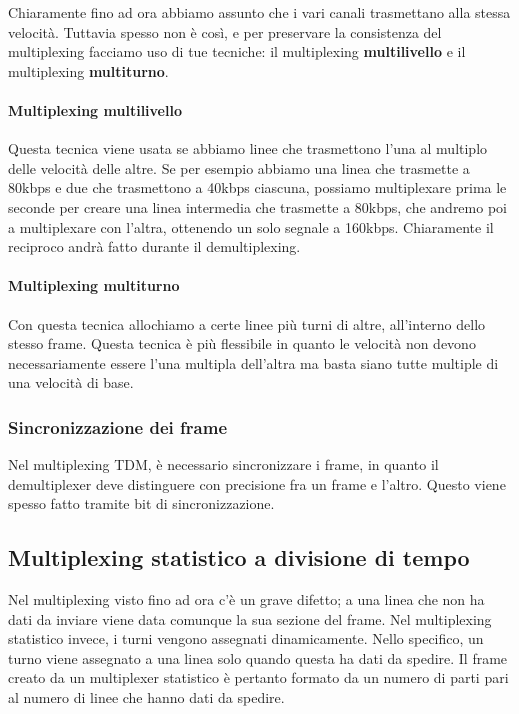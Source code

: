         Chiaramente fino ad ora abbiamo assunto che i vari canali trasmettano alla stessa velocità. Tuttavia spesso non è così, e per preservare la consistenza del multiplexing facciamo uso di tue tecniche: il multiplexing \textbf{multilivello} e il multiplexing \textbf{multiturno}.
        
        \paragraph{Multiplexing multilivello} Questa tecnica viene usata se abbiamo linee che trasmettono l'una al multiplo delle velocità delle altre. Se per esempio abbiamo una linea che trasmette a 80kbps e due che trasmettono a 40kbps ciascuna, possiamo multiplexare prima le seconde per creare una linea intermedia che trasmette a 80kbps, che andremo poi a multiplexare con l'altra, ottenendo un solo segnale a 160kbps. Chiaramente il reciproco andrà fatto durante il demultiplexing.
        
        \paragraph{Multiplexing multiturno} Con questa tecnica allochiamo a certe linee più turni di altre, all'interno dello stesso frame. Questa tecnica è più flessibile in quanto le velocità non devono necessariamente essere l'una multipla dell'altra ma basta siano tutte multiple di una velocità di base.
        
        \subsubsection{Sincronizzazione dei frame}
            Nel multiplexing TDM, è necessario sincronizzare i frame, in quanto il demultiplexer deve distinguere con precisione fra un frame e l'altro. Questo viene spesso fatto tramite bit di sincronizzazione.
            
    \subsection{Multiplexing statistico a divisione di tempo}
        Nel multiplexing visto fino ad ora c'è un grave difetto; a una linea che non ha dati da inviare viene data comunque la sua sezione del frame. Nel multiplexing statistico invece, i turni vengono assegnati dinamicamente. Nello specifico, un turno viene assegnato a una linea solo quando questa ha dati da spedire. Il frame creato da un multiplexer statistico è pertanto formato da un numero di parti pari al numero di linee che hanno dati da spedire.
        
